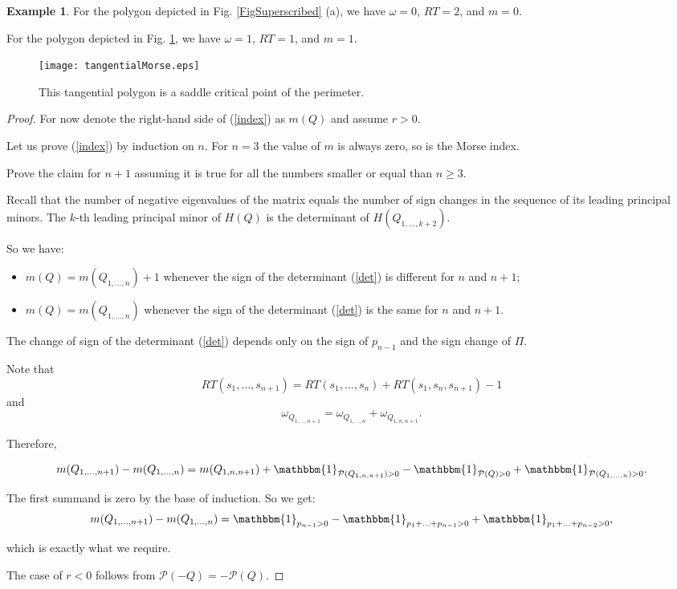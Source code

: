 \documentclass[12pt]{amsart}
\theoremstyle{plain}
\theoremstyle{definition}
\newtheorem{example}{Example}
\theoremstyle{remark}
\theoremstyle{plain}
\theoremstyle{definition}
\renewcommand{\geq}{\geqslant}
\begin{document}
\begin{example}
  For the polygon depicted in Fig. \ref{FigSuperscribed}  (a), we have $\omega=0$, $RT=2$, and $m=0$.

	For the polygon depicted in Fig. \ref{FigTanMorse}, we have $\omega=1$, $RT=1$, and $m=1$.
\end{example}


\begin{figure}[h]
\centering \texttt{[image: tangentialMorse.eps]}
\caption{This tangential  polygon is a saddle critical point of the perimeter.}\label{FigTanMorse}
\end{figure}
\begin{proof}

For now denote the right-hand side of (\ref{index}) as \(m(Q)\) and assume \(r>0\).

Let us prove (\ref{index}) by induction on \(n\).
For \(n=3\) the value of \(m\) is always zero, so is the Morse index.

Prove the claim for \(n+1\) assuming it is true for all the numbers smaller or equal than \(n\geq 3\).

Recall that the number of negative eigenvalues of the matrix equals the number of sign changes in the sequence of its leading principal minors. The \(k\)-th leading principal minor of \(H(Q)\) is the determinant of \(H(Q_{1,\ldots,k+2})\).

So we have:
\begin{itemize}
\item \(m(Q)=m(Q_{1,\ldots,n})+1\) whenever the sign of the determinant (\ref{det}) is different for \(n\) and \(n+1\);
\item \(m(Q)=m(Q_{1,\ldots,n})\) whenever the sign of the determinant (\ref{det}) is the same for \(n\) and \(n+1\).
\end{itemize}

The change of sign of the determinant (\ref{det}) depends only on the sign of \(p_{n-1}\) and the sign change of \(\Pi\).

Note that
\[
RT(s_1,\ldots,s_{n+1})=RT(s_1,\ldots,s_n)+RT(s_1,s_n,s_{n+1})-1
\]
and
\[
\omega_{Q_{1,\ldots,n+1}}=\omega_{Q_{1,\ldots,n}}+\omega_{Q_{1,n,n+1}}.
\]


Therefore,


\[
m(Q_{1,\ldots,n+1})-m(Q_{1,\ldots,n})=m(Q_{1,n,n+1})+\mathbbm{1}_{\mathcal{P}(Q_{1,n,n+1})>0}-\mathbbm{1}_{\mathcal{P}(Q)>0}+\mathbbm{1}_{\mathcal{P}(Q_{1,\ldots,n})>0}.
\]

The first summand is zero by the base of induction. So we get:
\[
m(Q_{1,\ldots,n+1})-m(Q_{1,\ldots,n})=\mathbbm{1}_{p_{n-1}>0}-\mathbbm{1}_{p_1+\ldots+p_{n-1}>0}+\mathbbm{1}_{p_1+\ldots+p_{n-2}>0},
\]

which is exactly what we require.

The case of \(r<0\) follows from \(\mathcal{P}(-Q)=-\mathcal{P}(Q)\).


\end{proof}
\end{document}
